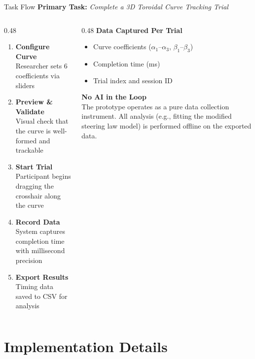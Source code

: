 \documentclass[aspectratio=169, 10pt]{beamer}
\begin{document}
\begin{frame}{Task Flow}
  \textbf{Primary Task:} \emph{Complete a 3D Toroidal Curve Tracking Trial}
  \begin{columns}[T]
    \begin{column}{0.48\textwidth}
      \begin{enumerate}
        \item \textbf{Configure Curve}\\
              Researcher sets 6 coefficients via sliders
        \item \textbf{Preview \& Validate}\\
              Visual check that the curve is well-formed and trackable
        \item \textbf{Start Trial}\\
              Participant begins dragging the crosshair along the curve
        \item \textbf{Record Data}\\
              System captures completion time with millisecond precision
        \item \textbf{Export Results}\\
              Timing data saved to CSV for analysis
      \end{enumerate}
    \end{column}
    \begin{column}{0.48\textwidth}
      \textbf{Data Captured Per Trial}
      \begin{itemize}
        \item Curve coefficients ($\alpha_1$--$\alpha_3$, $\beta_1$--$\beta_3$)
        \item Completion time (ms)
        \item Trial index and session ID
      \end{itemize}

      \vspace{0.5em}
      \textbf{No AI in the Loop}\\
      The prototype operates as a pure data collection instrument. All analysis (e.g., fitting the modified steering law model) is performed offline on the exported data.
    \end{column}
  \end{columns}
\end{frame}

\section{Implementation Details}
\end{document}
